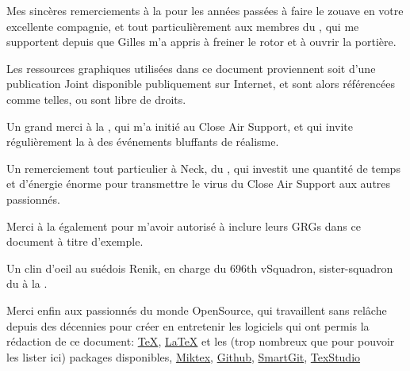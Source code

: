 %

\begin{imini}
Mes sincères remerciements à la \thirdwing{} pour les années passées à faire le zouave en votre excellente compagnie, et tout particulièrement aux membres du \rgt{} \inmem{}, qui me supportent depuis que Gilles m'a appris à freiner le rotor et à ouvrir la portière.

Les ressources graphiques utilisées dans ce document proviennent soit d'une publication Joint disponible publiquement sur Internet, et sont alors référencées comme telles, ou sont libre de droits.

Un grand merci à la \onethreetwo{}, qui m'a initié au Close Air Support, et qui invite régulièrement la \thirdwing{} à des événements bluffants de réalisme.


Un remerciement tout particulier à Neck, du \onethreetwo{}, qui investit une quantité de temps et d'énergie énorme pour transmettre le virus du Close Air Support aux autres passionnés.


Merci à la \onethreetwo{} également pour m'avoir autorisé à inclure leurs GRGs dans ce document à titre d'exemple.


Un clin d'oeil au suédois Renik, en charge du 696th vSquadron, sister-squadron du \rgt{} à la \onethreetwo{}.

Merci enfin aux passionnés du monde OpenSource, qui travaillent sans relâche depuis des décennies pour créer en entretenir les logiciels qui ont permis la rédaction de ce document:
\href{https://www.tug.org/}{TeX}, \href{https://www.latex-project.org/}{\LaTeX} et les (trop nombreux que pour pouvoir les lister ici) packages disponibles, \href{http://miktex.org/}{Miktex}, \href{https://github.com/}{Github}, \href{https://www.syntevo.com/smartgit/}{SmartGit}, \href{http://www.texstudio.org/}{TexStudio}%



\end{imini}